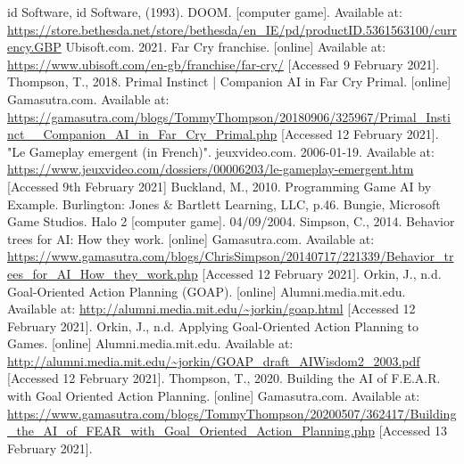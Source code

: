 \documentclass[10pt]{report}
\begin{document}
\begin{thebibliography}{}
    id Software, id Software, (1993). DOOM. [computer game]. Available at: \url{https://store.bethesda.net/store/bethesda/en_IE/pd/productID.5361563100/currency.GBP}
    Ubisoft.com. 2021. Far Cry franchise. [online] Available at: \url{https://www.ubisoft.com/en-gb/franchise/far-cry/} [Accessed 9 February 2021].
    Thompson, T., 2018. Primal Instinct | Companion AI in Far Cry Primal. [online] Gamasutra.com. Available at: \url{https://gamasutra.com/blogs/TommyThompson/20180906/325967/Primal_Instinct__Companion_AI_in_Far_Cry_Primal.php} [Accessed 12 February 2021].
    "Le Gameplay emergent (in French)". jeuxvideo.com. 2006-01-19. Available at: \url{https://www.jeuxvideo.com/dossiers/00006203/le-gameplay-emergent.htm} [Accessed 9th February 2021]
    Buckland, M., 2010. Programming Game AI by Example. Burlington: Jones \& Bartlett Learning, LLC, p.46.
    Bungie, Microsoft Game Studios. Halo 2 [computer game]. 04/09/2004.
    Simpson, C., 2014. Behavior trees for AI: How they work. [online] Gamasutra.com. Available at: \url{https://www.gamasutra.com/blogs/ChrisSimpson/20140717/221339/Behavior_trees_for_AI_How_they_work.php} [Accessed 12 February 2021].
    Orkin, J., n.d. Goal-Oriented Action Planning (GOAP). [online] Alumni.media.mit.edu. Available at: \url{http://alumni.media.mit.edu/~jorkin/goap.html} [Accessed 12 February 2021].
    Orkin, J., n.d. Applying Goal-Oriented Action Planning to Games. [online] Alumni.media.mit.edu. Available at: \url{http://alumni.media.mit.edu/~jorkin/GOAP_draft_AIWisdom2_2003.pdf} [Accessed 12 February 2021].
    Thompson, T., 2020. Building the AI of F.E.A.R. with Goal Oriented Action Planning. [online] Gamasutra.com. Available at: \url{https://www.gamasutra.com/blogs/TommyThompson/20200507/362417/Building_the_AI_of_FEAR_with_Goal_Oriented_Action_Planning.php} [Accessed 13 February 2021].
\end{thebibliography}
\end{document}

